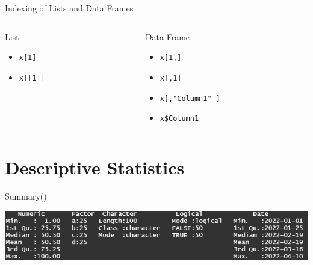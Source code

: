 \documentclass[xcolor=dvipsnames, aspectratio = 169]{beamer}
\begin{document}
\begin{frame}[fragile]{Indexing of Lists and Data Frames}
	
	\begin{columns}[T]
	\begin{column}{0.5\textwidth}
List
		\begin{itemize}
		\item \verb+x[1]+
		\item \verb+x[[1]]+
	\end{itemize}
	\end{column}
	\begin{column}{0.5\textwidth}
Data Frame
	\begin{itemize}
		\item  \verb+x[1,]+
		\item  \verb+x[,1]+
		\item  \verb+x[,"Column1" ]+
		\item  \verb+x$Column1+
	\end{itemize}
	\end{column}
\end{columns}

\end{frame}

\section{Descriptive Statistics}

\begin{frame}{Summary()}
	\begin{center}
		\includegraphics[scale=0.9]{Summary}
	\end{center}
\end{frame}
\end{document}
